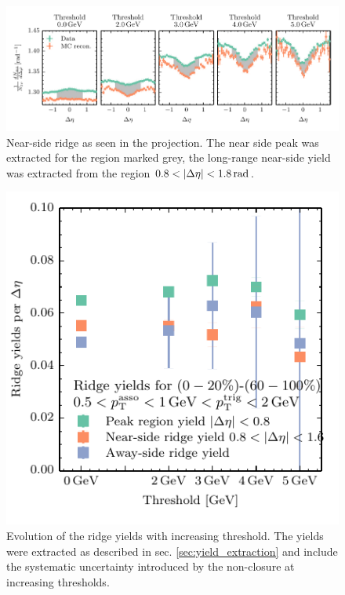 \begin{figure}
  \centering
  \includegraphics[]{figures/nearside_peak_yield.pdf}
  \caption[Near-side ridge as seen in the \deta projection with MC reconstructed data for various threshold.]{Near-side ridge as seen in the \deta projection. The near side peak was extracted for the region marked grey, the long-range near-side yield was extracted from the region $0.8 < |\Delta\eta| < \SI{1.8}{rad}$.}
  \label{fig:near_side_ridge_yield}
\end{figure}

\begin{figure}
  \centering
  \includegraphics[]{figures/yield_evolution.pdf}
  \caption[Evolution of the ridge yields with increasing threshold.]{Evolution of the ridge yields with increasing threshold. The yields were extracted as described in sec. \ref{sec:yield_extraction} and include the systematic uncertainty introduced by the non-closure at increasing thresholds.}
  \label{fig:ridge_yield_evo}
\end{figure}



